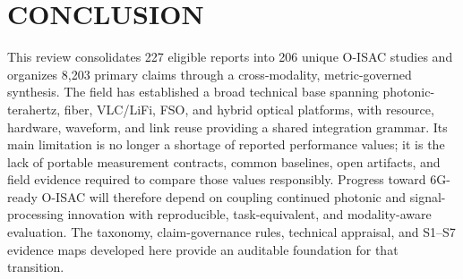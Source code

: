 \section{CONCLUSION}
\label{sec:conclusion_206}

This review consolidates 227 eligible reports into 206 unique O-ISAC studies
and organizes 8,203 primary claims through a cross-modality, metric-governed
synthesis. The field has established a broad technical base spanning
photonic-terahertz, fiber, VLC/LiFi, FSO, and hybrid optical platforms, with
resource, hardware, waveform, and link reuse providing a shared integration
grammar. Its main limitation is no longer a shortage of reported performance
values; it is the lack of portable measurement contracts, common baselines,
open artifacts, and field evidence required to compare those values
responsibly. Progress toward 6G-ready O-ISAC will therefore depend on coupling
continued photonic and signal-processing innovation with reproducible,
task-equivalent, and modality-aware evaluation. The taxonomy, claim-governance
rules, technical appraisal, and S1--S7 evidence maps developed here provide an
auditable foundation for that transition.
